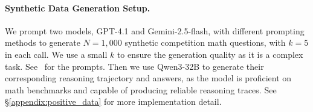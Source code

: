 \paragraph{Synthetic Data Generation Setup.} 


We prompt two models, GPT-4.1 and Gemini-2.5-flash, with different prompting methods to generate $N=1,000$ synthetic competition math questions, with $k=5$ in each call. We use a small $k$ to ensure the generation quality as it is a complex task. See~ for the prompts. Then we use Qwen3-32B to generate their corresponding reasoning trajectory and answers, as the model is proficient on math benchmarks and capable of producing reliable reasoning traces. See \S\ref{appendix:positive_data} for more implementation detail. 

